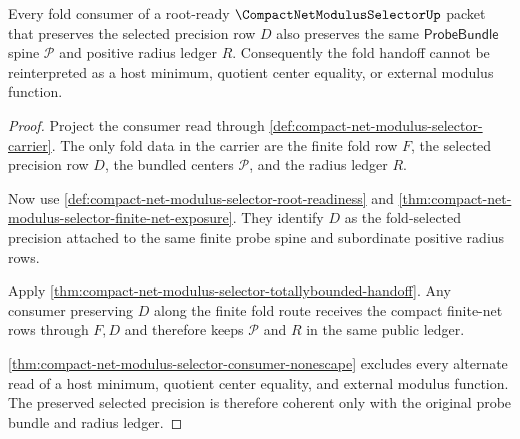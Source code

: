 \begin{theorem}
\label{thm:compact-net-modulus-selector-fold-consumer-coherence}
Every fold consumer of a root-ready $\CompactNetModulusSelectorUp$ packet that preserves the selected precision row $D$ also preserves the same $\mathsf{ProbeBundle}$ spine $\mathcal{P}$ and positive radius ledger $R$. Consequently the fold handoff cannot be reinterpreted as a host minimum, quotient center equality, or external modulus function.
\end{theorem}
\begin{proof}
Project the consumer read through \autoref{def:compact-net-modulus-selector-carrier}. The only fold data in the carrier are the finite fold row $F$, the selected precision row $D$, the bundled centers $\mathcal{P}$, and the radius ledger $R$.

Now use \autoref{def:compact-net-modulus-selector-root-readiness} and \autoref{thm:compact-net-modulus-selector-finite-net-exposure}. They identify $D$ as the fold-selected precision attached to the same finite probe spine and subordinate positive radius rows.

Apply \autoref{thm:compact-net-modulus-selector-totallybounded-handoff}. Any consumer preserving $D$ along the finite fold route receives the compact finite-net rows through $F,D$ and therefore keeps $\mathcal{P}$ and $R$ in the same public ledger.

\autoref{thm:compact-net-modulus-selector-consumer-nonescape} excludes every alternate read of a host minimum, quotient center equality, and external modulus function. The preserved selected precision is therefore coherent only with the original probe bundle and radius ledger.
\end{proof}

